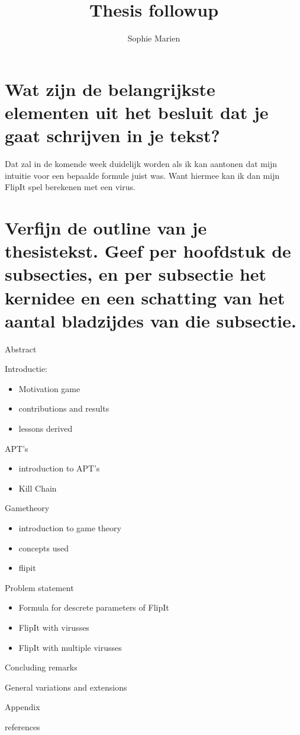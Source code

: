 \documentclass[a4paper, 11pt]{article}
\begin{document}
\begin{titlepage}
\title{Thesis followup}
\author{Sophie Marien}
\end{titlepage}



\maketitle


\section{Wat zijn de belangrijkste elementen uit het besluit dat je gaat schrijven in je tekst?}
Dat zal in de komende week duidelijk worden als ik kan aantonen dat mijn intuitie voor een bepaalde formule juist was. Want hiermee kan ik dan mijn FlipIt spel berekenen met een virus.
\section{Verfijn de outline van je thesistekst. Geef per hoofdstuk de subsecties, en per subsectie het kernidee en een schatting van het aantal bladzijdes van die subsectie.}
\begin{description}
\item Abstract
\item Introductie:
\begin{itemize}
\item Motivation game
\item contributions and results
\item lessons derived
\end{itemize}
\item APT's
\begin{itemize}
\item introduction to APT's
\item Kill Chain
\end{itemize}
\item Gametheory
\begin{itemize}
\item introduction to game theory
\item concepts used 
\item flipit
\end{itemize}
\item Problem statement
\begin{itemize}
\item Formula for descrete parameters of FlipIt
\item FlipIt with virusses
\item FlipIt with multiple virusses
\end{itemize}
\item Concluding remarks
\item General variations and extensions
\item Appendix
\item references
\end{description}
\end{document}
